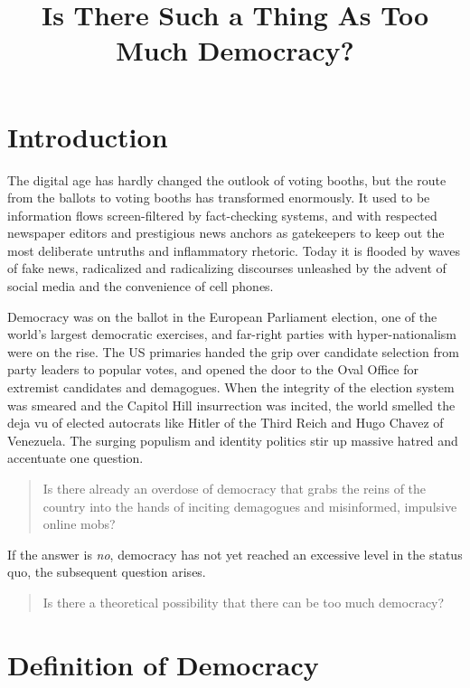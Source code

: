 \documentclass{scrartcl}
\theoremstyle{definition}
\begin{document}
\title{Is There Such a Thing As Too Much Democracy?}
\author{}
\date{}
\maketitle

\section{Introduction}

The digital age has hardly changed the outlook of voting booths, but the route from the ballots to voting booths has transformed enormously. It used to be information flows screen-filtered by fact-checking systems, and with respected newspaper editors and prestigious news anchors as gatekeepers to keep out the most deliberate untruths and inflammatory rhetoric. Today it is flooded by waves of fake news, radicalized and radicalizing discourses unleashed by the advent of social media and the convenience of cell phones. 

Democracy was on the ballot in the European Parliament election, one of the world’s largest democratic exercises, and far-right parties with hyper-nationalism were on the rise. The US primaries handed the grip over candidate selection from party leaders to popular votes, and opened the door to the Oval Office for extremist candidates and demagogues. When the integrity of the election system was smeared and the Capitol Hill insurrection was incited, the world smelled the deja vu of elected autocrats like Hitler of the Third Reich and Hugo Chavez of Venezuela. The surging populism and identity politics stir up massive hatred and accentuate one question. 

\begin{quote}
Is there already an overdose of democracy that grabs the reins of the country into the hands of inciting demagogues and misinformed, impulsive online mobs? 
\end{quote}

If the answer is \emph{no}, democracy has not yet reached an excessive level in the status quo, the subsequent question arises.

\begin{quote}
Is there a theoretical possibility that there can be too much democracy? 
\end{quote}

\section{Definition of Democracy}
\end{document}
